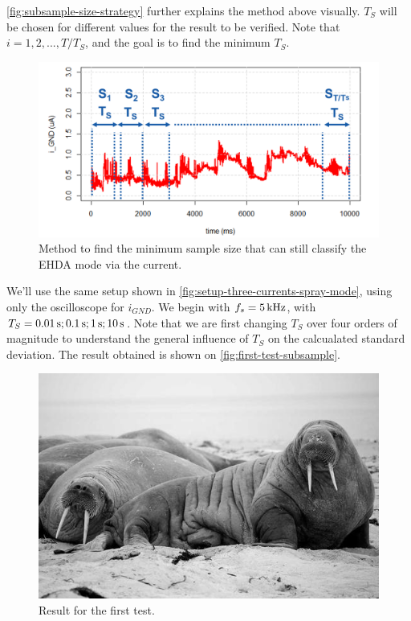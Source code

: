\documentclass[oneside,12pt]{article}
\begin{document}
\autoref{fig:subsample-size-strategy} further explains the method above visually. $T_S$ will be chosen for different values for the result to be verified. 
Note that $i = 1, 2, ..., T / T_S$, and the goal is to find the minimum $T_S$.

\begin{figure}[h!]
    \centering
    \includegraphics[width=.8\textwidth,trim=1 1 1 1,clip]{figures/subsample-size-strategy.png}
    \caption{Method to find the minimum sample size that can still classify the EHDA mode via the current.}
    \label{fig:subsample-size-strategy}
\end{figure}

We'll use the same setup shown in \autoref{fig:setup-three-currents-spray-mode}, using only the oscilloscope for $i_{GND}$.
We begin with $f_s = 5 \,\mathrm{kHz}$, with $T_S = 0.01 \,\mathrm{s}; 0.1 \,\mathrm{s}; 1 \,\mathrm{s}; 10 \,\mathrm{s}$. Note that we are first changing
$T_S$ over four orders of magnitude to understand the general influence of $T_S$ on the calcualated standard deviation.
The result obtained is shown on \autoref{fig:first-test-subsample}.

\begin{figure}[h!]
    \centering
    \includegraphics[width=.8\textwidth,trim=1 1 1 1,clip]{figures/lorem-picsum.jpg}
    \caption{Result for the first test.}
    \label{fig:first-test-subsample}
\end{figure}
\end{document}
